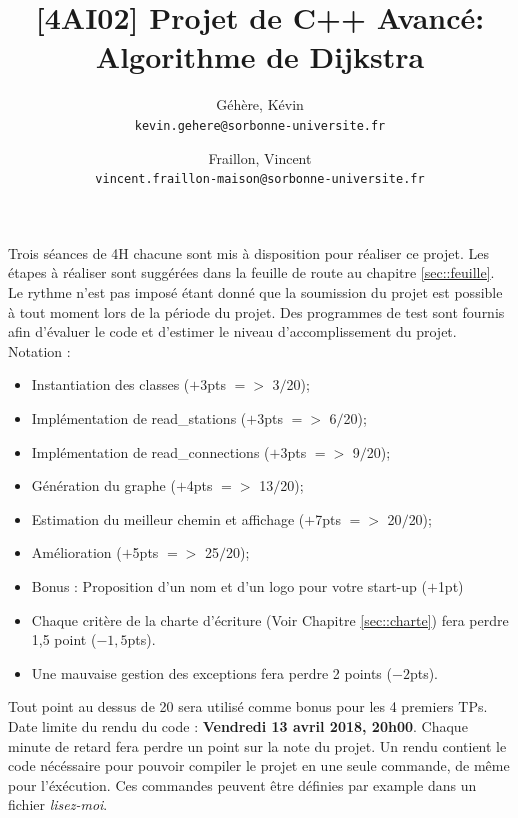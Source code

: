 \documentclass[9pts]{article}
\title{[4AI02] Projet de C++ Avancé: Algorithme de Dijkstra}
\author{
  Géhère, Kévin\\
  \texttt{kevin.gehere@sorbonne-universite.fr}
  \and
  Fraillon, Vincent\\
  \texttt{vincent.fraillon-maison@sorbonne-universite.fr}
}
\begin{document}
\makeatletter

\let\ps@plain=\ps@fancy

\makeatother
\maketitle

Trois séances de 4H chacune sont mis à disposition pour réaliser ce projet.
Les étapes à réaliser sont suggérées dans la feuille de route au chapitre \ref{sec::feuille}. Le rythme n'est pas imposé étant donné que la soumission du projet est possible à tout moment lors de la période du projet.
Des programmes de test sont fournis afin d'évaluer le code et d'estimer le niveau d'accomplissement du projet.\\

Notation :
\begin{itemize}
\item Instantiation des classes ($+$3pts $=>$ 3$/$20);
\item Implémentation de read\_stations ($+$3pts $=>$ 6$/$20);
\item Implémentation de read\_connections ($+$3pts $=>$ 9$/$20);
\item Génération du graphe ($+$4pts $=>$ 13$/$20);
\item Estimation du meilleur chemin et affichage ($+$7pts $=>$ 20$/$20);
\item Amélioration ($+$5pts $=>$ 25$/$20);
\item Bonus : Proposition d'un nom et d'un logo pour votre start-up ($+$1pt)
\item Chaque critère de la charte d'écriture (Voir Chapitre \ref{sec::charte}) fera perdre 1,5 point ($-1,5$pts).\\
\item Une mauvaise gestion des exceptions fera perdre 2 points ($-2$pts).\\
\end{itemize}

Tout point au dessus de 20 sera utilisé comme bonus pour les 4 premiers TPs.\\

Date limite du rendu du code : \textbf{Vendredi 13 avril 2018, 20h00}. Chaque minute de retard fera perdre un point sur la note du projet. Un rendu contient le code nécéssaire pour pouvoir compiler le projet en une seule commande, de même pour l'éxécution. Ces commandes peuvent être définies par example dans un fichier \emph{lisez-moi}. \\
\end{document}

